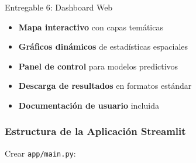\documentclass[12pt,a4paper]{article}
\begin{document}
\begin{deliverable}{Entregable 6: Dashboard Web}
\begin{itemize}
    \item \textbf{Mapa interactivo} con capas temáticas
    \item \textbf{Gráficos dinámicos} de estadísticas espaciales
    \item \textbf{Panel de control} para modelos predictivos
    \item \textbf{Descarga de resultados} en formatos estándar
    \item \textbf{Documentación de usuario} incluida
\end{itemize}
\end{deliverable}

\subsubsection{Estructura de la Aplicación Streamlit}

Crear \texttt{app/main.py}:
\end{document}
